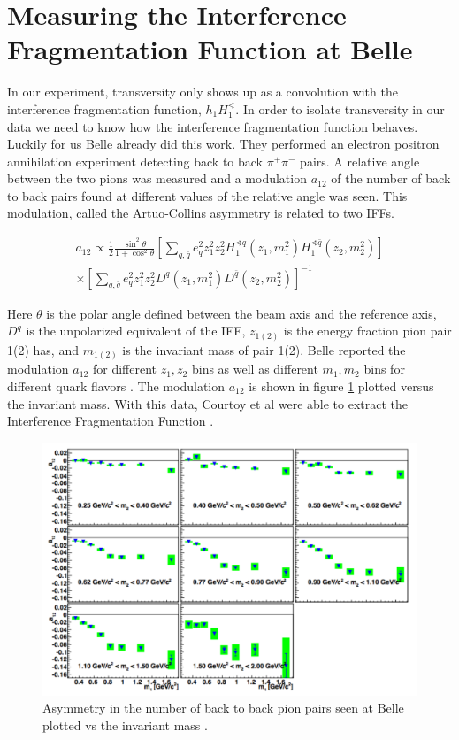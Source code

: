 \documentclass[abstract = on,listof=totoc, bibliography=totoc]{scrreprt}
\begin{document}
\section{Measuring the Interference Fragmentation Function at Belle}

In our experiment, transversity only shows up as a convolution with the interference fragmentation function, $h_1H_1^\sphericalangle$. In order to isolate transversity in our data we need to know how the interference fragmentation function behaves. Luckily for us Belle already did this work\cite{belleIFF}. They performed an electron positron annihilation experiment detecting back to back $\pi^+\pi^-$ pairs. A relative angle between the two pions was measured and a modulation $a_{12}$ of the number of back to back pairs found at different values of the relative angle was seen. This modulation, called the Artuo-Collins asymmetry is related to two IFFs. 
     
\begin{multline}
a_{12} \propto \frac{1}{2} \frac{\sin^2\theta}{1+\cos^2\theta} \left[ \sum_{q,\bar{q}}e_q^2z_1^2z_2^2H_1^{\sphericalangle q}(z_1, m_1^2)H_1^{\sphericalangle \bar{q}}(z_2, m_2^2)\right] \\ \times \left[ \sum_{q,\bar{q}}e_q^2z_1^2z_2^2D^{q}(z_1, m_1^2)D^{\bar{q}}(z_2, m_2^2)\right]^{-1}
\label{eq:A-Casym}
\end{multline}

Here $\theta$ is the polar angle defined between the beam axis and the reference axis, $D^q$ is the unpolarized equivalent of the IFF, $z_{1(2)}$ is the energy fraction pion pair 1(2) has, and $m_{1(2)}$ is the invariant mass of pair 1(2). Belle reported the modulation $a_{12}$ for different $z_1,z_2$ bins as well as different $m_1,m_2$ bins for different quark flavors \cite{belleIFF}. The modulation $a_{12}$ is shown in figure \ref{fig:BelleMod} plotted versus the invariant mass. With this data, Courtoy et al were able to extract the Interference Fragmentation Function \cite{extractIFF}.

 \begin{figure}
\begin{center}
\includegraphics[width = .7\textwidth]{BelleAnnModulationM}
\caption[Asymmetry seen in $e^-e^+$ annihilation at Belle]{Asymmetry in the number of back to back pion pairs seen at Belle plotted vs the invariant mass \cite{belleIFF}.}
\label{fig:BelleMod}
\end{center}
\end{figure}
\end{document}

